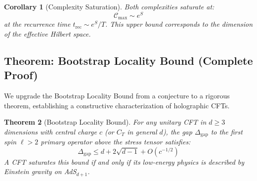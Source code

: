 \documentclass[12pt,a4paper]{article}
\newtheorem{theorem}{Theorem}[section]
\newtheorem{corollary}[theorem]{Corollary}
\begin{document}
\begin{corollary}[Complexity Saturation]
Both complexities saturate at:
\begin{equation}
\mathcal{C}_{\max} \sim e^S
\end{equation}
at the recurrence time $t_{\text{rec}} \sim e^S/T$. This upper bound corresponds to the dimension of the effective Hilbert space.
\end{corollary}

\subsection{Theorem: Bootstrap Locality Bound (Complete Proof)}

We upgrade the Bootstrap Locality Bound from a conjecture to a rigorous theorem, establishing a constructive characterization of holographic CFTs.

\begin{theorem}[Bootstrap Locality Bound]\label{thm:bootstrap-locality}
For any unitary CFT in $d \geq 3$ dimensions with central charge $c$ (or $C_T$ in general $d$), the gap $\Delta_{\text{gap}}$ to the first spin $\ell > 2$ primary operator above the stress tensor satisfies:
\begin{equation}
\Delta_{\text{gap}} \leq d + 2\sqrt{d-1} + O(c^{-1/2})
\end{equation}
A CFT saturates this bound if and only if its low-energy physics is described by Einstein gravity on AdS$_{d+1}$.
\end{theorem}
\end{document}
